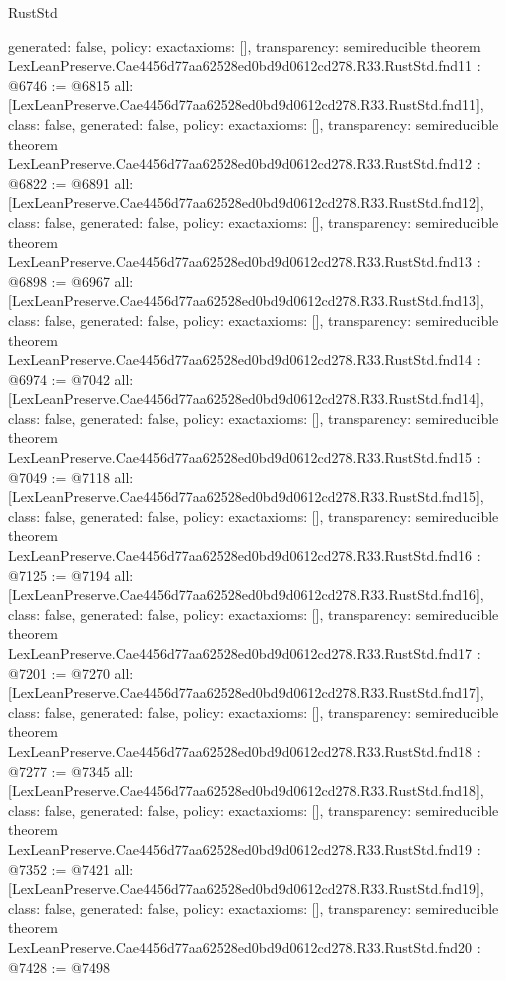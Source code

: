 \begin{lexlean}{RustStd}
\begin{coremodule}
{  generated: false,
  policy: exact{axioms: []},
  transparency: semireducible
}
theorem LexLeanPreserve.Cae4456d77aa62528ed0bd9d0612cd278.R33.RustStd.fnd11 : @6746 := @6815 {
  all: [LexLeanPreserve.Cae4456d77aa62528ed0bd9d0612cd278.R33.RustStd.fnd11],
  class: false,
  generated: false,
  policy: exact{axioms: []},
  transparency: semireducible
}
theorem LexLeanPreserve.Cae4456d77aa62528ed0bd9d0612cd278.R33.RustStd.fnd12 : @6822 := @6891 {
  all: [LexLeanPreserve.Cae4456d77aa62528ed0bd9d0612cd278.R33.RustStd.fnd12],
  class: false,
  generated: false,
  policy: exact{axioms: []},
  transparency: semireducible
}
theorem LexLeanPreserve.Cae4456d77aa62528ed0bd9d0612cd278.R33.RustStd.fnd13 : @6898 := @6967 {
  all: [LexLeanPreserve.Cae4456d77aa62528ed0bd9d0612cd278.R33.RustStd.fnd13],
  class: false,
  generated: false,
  policy: exact{axioms: []},
  transparency: semireducible
}
theorem LexLeanPreserve.Cae4456d77aa62528ed0bd9d0612cd278.R33.RustStd.fnd14 : @6974 := @7042 {
  all: [LexLeanPreserve.Cae4456d77aa62528ed0bd9d0612cd278.R33.RustStd.fnd14],
  class: false,
  generated: false,
  policy: exact{axioms: []},
  transparency: semireducible
}
theorem LexLeanPreserve.Cae4456d77aa62528ed0bd9d0612cd278.R33.RustStd.fnd15 : @7049 := @7118 {
  all: [LexLeanPreserve.Cae4456d77aa62528ed0bd9d0612cd278.R33.RustStd.fnd15],
  class: false,
  generated: false,
  policy: exact{axioms: []},
  transparency: semireducible
}
theorem LexLeanPreserve.Cae4456d77aa62528ed0bd9d0612cd278.R33.RustStd.fnd16 : @7125 := @7194 {
  all: [LexLeanPreserve.Cae4456d77aa62528ed0bd9d0612cd278.R33.RustStd.fnd16],
  class: false,
  generated: false,
  policy: exact{axioms: []},
  transparency: semireducible
}
theorem LexLeanPreserve.Cae4456d77aa62528ed0bd9d0612cd278.R33.RustStd.fnd17 : @7201 := @7270 {
  all: [LexLeanPreserve.Cae4456d77aa62528ed0bd9d0612cd278.R33.RustStd.fnd17],
  class: false,
  generated: false,
  policy: exact{axioms: []},
  transparency: semireducible
}
theorem LexLeanPreserve.Cae4456d77aa62528ed0bd9d0612cd278.R33.RustStd.fnd18 : @7277 := @7345 {
  all: [LexLeanPreserve.Cae4456d77aa62528ed0bd9d0612cd278.R33.RustStd.fnd18],
  class: false,
  generated: false,
  policy: exact{axioms: []},
  transparency: semireducible
}
theorem LexLeanPreserve.Cae4456d77aa62528ed0bd9d0612cd278.R33.RustStd.fnd19 : @7352 := @7421 {
  all: [LexLeanPreserve.Cae4456d77aa62528ed0bd9d0612cd278.R33.RustStd.fnd19],
  class: false,
  generated: false,
  policy: exact{axioms: []},
  transparency: semireducible
}
theorem LexLeanPreserve.Cae4456d77aa62528ed0bd9d0612cd278.R33.RustStd.fnd20 : @7428 := @7498 {
}
\end{coremodule}
\end{lexlean}
